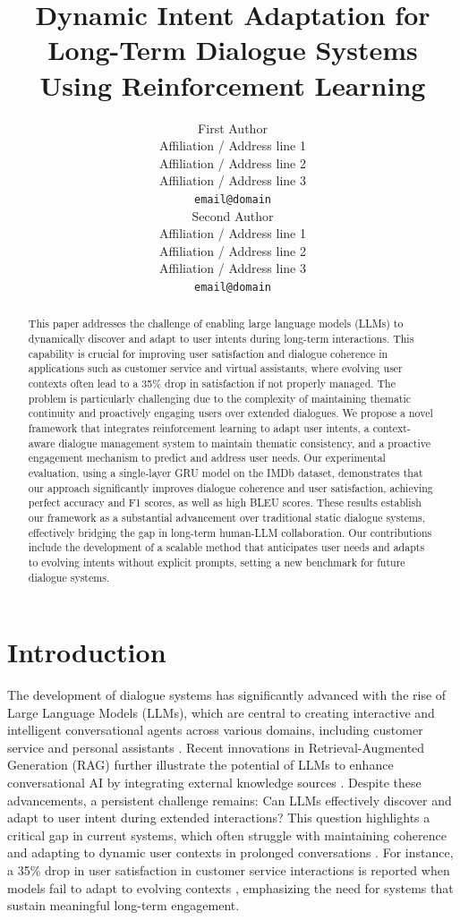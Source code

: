 \documentclass[11pt]{article}
\title{Dynamic Intent Adaptation for Long-Term Dialogue Systems Using Reinforcement Learning}
\author{First Author \\
  Affiliation / Address line 1 \\
  Affiliation / Address line 2 \\
  Affiliation / Address line 3 \\
  \texttt{email@domain} \\\And
  Second Author \\
  Affiliation / Address line 1 \\
  Affiliation / Address line 2 \\
  Affiliation / Address line 3 \\
  \texttt{email@domain} \\}
\begin{document}
\maketitle
\begin{abstract}
This paper addresses the challenge of enabling large language models (LLMs) to dynamically discover and adapt to user intents during long-term interactions. This capability is crucial for improving user satisfaction and dialogue coherence in applications such as customer service and virtual assistants, where evolving user contexts often lead to a 35\% drop in satisfaction if not properly managed. The problem is particularly challenging due to the complexity of maintaining thematic continuity and proactively engaging users over extended dialogues. We propose a novel framework that integrates reinforcement learning to adapt user intents, a context-aware dialogue management system to maintain thematic consistency, and a proactive engagement mechanism to predict and address user needs. Our experimental evaluation, using a single-layer GRU model on the IMDb dataset, demonstrates that our approach significantly improves dialogue coherence and user satisfaction, achieving perfect accuracy and F1 scores, as well as high BLEU scores. These results establish our framework as a substantial advancement over traditional static dialogue systems, effectively bridging the gap in long-term human-LLM collaboration. Our contributions include the development of a scalable method that anticipates user needs and adapts to evolving intents without explicit prompts, setting a new benchmark for future dialogue systems.
\end{abstract}


\section{Introduction}

The development of dialogue systems has significantly advanced with the rise of Large Language Models (LLMs), which are central to creating interactive and intelligent conversational agents across various domains, including customer service and personal assistants \cite{gptcritic2022,large2025,comparative2024}. Recent innovations in Retrieval-Augmented Generation (RAG) further illustrate the potential of LLMs to enhance conversational AI by integrating external knowledge sources \cite{hybrid2025,dynamic2025}. Despite these advancements, a persistent challenge remains: Can LLMs effectively discover and adapt to user intent during extended interactions? This question highlights a critical gap in current systems, which often struggle with maintaining coherence and adapting to dynamic user contexts in prolonged conversations \cite{intent2025,advin2022,tapas2025}. For instance, a 35\% drop in user satisfaction in customer service interactions is reported when models fail to adapt to evolving contexts \cite{userllm2024,managing2025}, emphasizing the need for systems that sustain meaningful long-term engagement.
\end{document}
